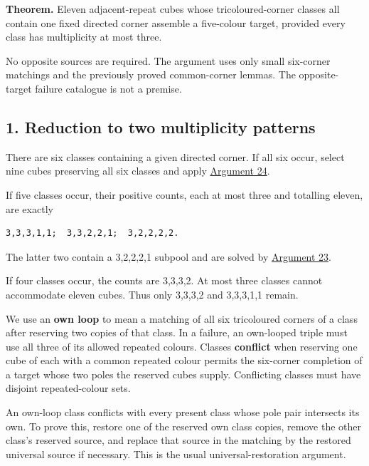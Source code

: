 \documentclass[
  10pt,
]{article}
\begin{document}
\textbf{Theorem.} Eleven adjacent-repeat cubes whose tricoloured-corner
classes all contain one fixed directed corner assemble a five-colour
target, provided every class has multiplicity at most three.

No opposite sources are required. The argument uses only small
six-corner matchings and the previously proved common-corner lemmas. The
opposite-target failure catalogue is not a premise.

\hypertarget{reduction-to-two-multiplicity-patterns}{%
\subsection*{1. Reduction to two multiplicity
patterns}\label{reduction-to-two-multiplicity-patterns}}

There are six classes containing a given directed corner. If all six
occur, select nine cubes preserving all six classes and apply
\protect\hyperlink{arg-24}{Argument 24}.

If five classes occur, their positive counts, each at most three and
totalling eleven, are exactly

\begin{verbatim}
3,3,3,1,1;  3,3,2,2,1;  3,2,2,2,2.
\end{verbatim}

The latter two contain a 3,2,2,2,1 subpool and are solved by
\protect\hyperlink{arg-23}{Argument 23}.

If four classes occur, the counts are 3,3,3,2. At most three classes
cannot accommodate eleven cubes. Thus only 3,3,3,2 and 3,3,3,1,1 remain.

We use an \textbf{own loop} to mean a matching of all six tricoloured
corners of a class after reserving two copies of that class. In a
failure, an own-looped triple must use all three of its allowed repeated
colours. Classes \textbf{conflict} when reserving one cube of each with
a common repeated colour permits the six-corner completion of a target
whose two poles the reserved cubes supply. Conflicting classes must have
disjoint repeated-colour sets.

An own-loop class conflicts with every present class whose pole pair
intersects its own. To prove this, restore one of the reserved own class
copies, remove the other class's reserved source, and replace that
source in the matching by the restored universal source if necessary.
This is the usual universal-restoration argument.
\end{document}
